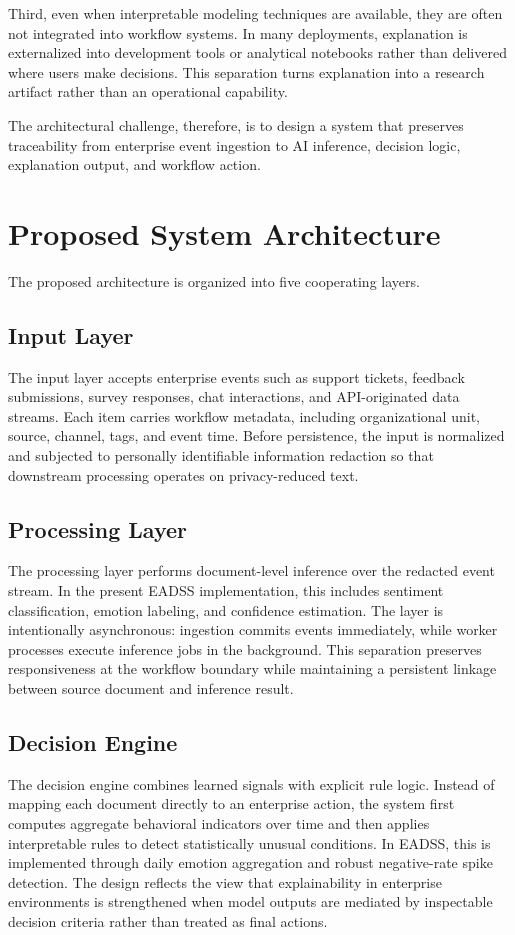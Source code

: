 \documentclass[conference]{IEEEtran}
\begin{document}
Third, even when interpretable modeling techniques are available, they are often not integrated into workflow systems. In many deployments, explanation is externalized into development tools or analytical notebooks rather than delivered where users make decisions. This separation turns explanation into a research artifact rather than an operational capability.

The architectural challenge, therefore, is to design a system that preserves traceability from enterprise event ingestion to AI inference, decision logic, explanation output, and workflow action.

\section{Proposed System Architecture}
The proposed architecture is organized into five cooperating layers.

\subsection{Input Layer}
The input layer accepts enterprise events such as support tickets, feedback submissions, survey responses, chat interactions, and API-originated data streams. Each item carries workflow metadata, including organizational unit, source, channel, tags, and event time. Before persistence, the input is normalized and subjected to personally identifiable information redaction so that downstream processing operates on privacy-reduced text.

\subsection{Processing Layer}
The processing layer performs document-level inference over the redacted event stream. In the present EADSS implementation, this includes sentiment classification, emotion labeling, and confidence estimation. The layer is intentionally asynchronous: ingestion commits events immediately, while worker processes execute inference jobs in the background. This separation preserves responsiveness at the workflow boundary while maintaining a persistent linkage between source document and inference result.

\subsection{Decision Engine}
The decision engine combines learned signals with explicit rule logic. Instead of mapping each document directly to an enterprise action, the system first computes aggregate behavioral indicators over time and then applies interpretable rules to detect statistically unusual conditions. In EADSS, this is implemented through daily emotion aggregation and robust negative-rate spike detection. The design reflects the view that explainability in enterprise environments is strengthened when model outputs are mediated by inspectable decision criteria rather than treated as final actions.
\end{document}
